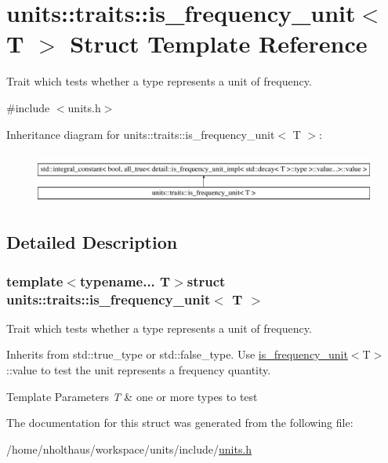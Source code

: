 \hypertarget{structunits_1_1traits_1_1is__frequency__unit}{}\section{units\+:\+:traits\+:\+:is\+\_\+frequency\+\_\+unit$<$ T $>$ Struct Template Reference}
\label{structunits_1_1traits_1_1is__frequency__unit}


Trait which tests whether a type represents a unit of frequency.  




{\ttfamily \#include $<$units.\+h$>$}

Inheritance diagram for units\+:\+:traits\+:\+:is\+\_\+frequency\+\_\+unit$<$ T $>$\+:\begin{figure}[H]
\begin{center}
\leavevmode
\includegraphics[height=1.725732cm]{structunits_1_1traits_1_1is__frequency__unit}
\end{center}
\end{figure}


\subsection{Detailed Description}
\subsubsection*{template$<$typename... T$>$struct units\+::traits\+::is\+\_\+frequency\+\_\+unit$<$ T $>$}

Trait which tests whether a type represents a unit of frequency. 

Inherits from {\ttfamily std\+::true\+\_\+type} or {\ttfamily std\+::false\+\_\+type}. Use {\ttfamily \hyperlink{structunits_1_1traits_1_1is__frequency__unit}{is\+\_\+frequency\+\_\+unit}$<$T$>$\+::value} to test the unit represents a frequency quantity. 
\begin{DoxyTemplParams}{Template Parameters}
{\em T} & one or more types to test \\
\hline
\end{DoxyTemplParams}


The documentation for this struct was generated from the following file\+:\begin{DoxyCompactItemize}
\item 
/home/nholthaus/workspace/units/include/\hyperlink{units_8h}{units.\+h}\end{DoxyCompactItemize}
